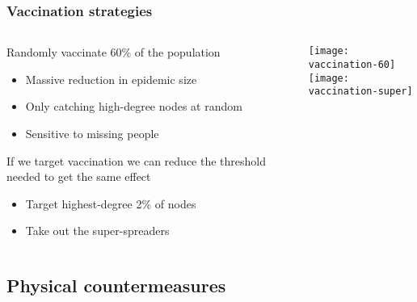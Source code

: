 \documentclass{beamer}
\begin{document}
\begin{frame}
  \frametitle{Vaccination strategies}

  \begin{columns}
    \begin{column}[c]{.7\textwidth}
       \begin{block}{Randomly vaccinate 60\% of the population}
        \begin{itemize}
        \item Massive reduction in epidemic size
        \item Only catching high-degree nodes at random
        \item Sensitive to missing people
        \end{itemize}
      \end{block}

      \begin{block}{If we target vaccination we can reduce the
          threshold needed to get the same effect}
        \begin{itemize}
        \item Target highest-degree 2\% of nodes
        \item Take out the super-spreaders
        \end{itemize}
      \end{block}
    \end{column}
    \begin{column}[c]{.3\textwidth}
      \texttt{[image: vaccination-60]}
       \\[.5cm]
       \texttt{[image: vaccination-super]}      
    \end{column}
  \end{columns}
\end{frame}


\subsection{Physical countermeasures}
\end{document}
